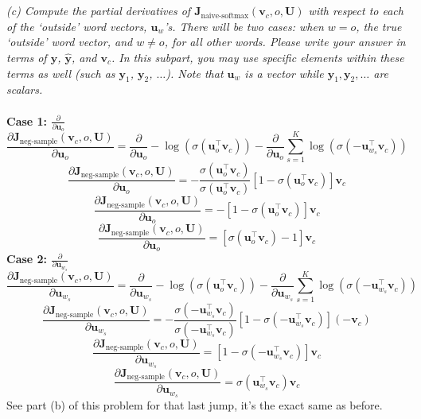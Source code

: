 \documentclass[12pt]{article}
\begin{document}
~\\
~\\
\emph{(c) Compute the partial derivatives of $\bm J_{\text{naive-softmax}}(\bm v_c, o, \bm U)$ with respect to 
each of the `outside' word vectors, $\bm u_w$'s. There will be two cases: when $w=o$, the true 
`outside' word vector, and $w \neq o$, for all other words. Please write your answer in terms of 
$\bm y$, $\hat{\bm y}$, and $\bm v_c$. In this subpart, you may use specific elements within these 
terms as well (such as $\bm y_1$, $\bm y_2$, $\dots$). Note that $\bm u_w$ is a vector while 
$\bm y_1, \bm y_2, \dots$ are scalars.}
~\\
~\\
\textbf{Case 1: $\frac{\partial}{\partial \bm u_o}$}
\begin{equation*}
    \frac{\partial \bm J_{\text{neg-sample}}(\bm v_c, o, \bm U)}{\partial \bm u_o} = 
    \frac{\partial}{\partial \bm u_o}
    -\log(\sigma(\bm u_o^\top \bm v_c)) - 
    \frac{\partial}{\partial \bm u_o}
    \sum_{s=1}^K \log(\sigma(-\bm u_{w_s}^\top \bm v_c))
\end{equation*}
\begin{equation*}
    \frac{\partial \bm J_{\text{neg-sample}}(\bm v_c, o, \bm U)}{\partial \bm u_o} = 
    - \frac{\sigma(\bm u_o^\top \bm v_c)}{\sigma(\bm u_o^\top \bm v_c)}
    [1 - \sigma(\bm u_o^\top \bm v_c)] \bm v_c
\end{equation*}
\begin{equation*}
    \frac{\partial \bm J_{\text{neg-sample}}(\bm v_c, o, \bm U)}{\partial \bm u_o} = 
    - [1 - \sigma(\bm u_o^\top \bm v_c)] \bm v_c
\end{equation*}
\begin{equation*}
    \frac{\partial \bm J_{\text{neg-sample}}(\bm v_c, o, \bm U)}{\partial \bm u_o} = 
    [\sigma(\bm u_o^\top \bm v_c) - 1] \bm v_c
\end{equation*}
\textbf{Case 2: $\frac{\partial}{\partial \bm u_{w_s}}$}
\begin{equation*}
    \frac{\partial \bm J_{\text{neg-sample}}(\bm v_c, o, \bm U)}{\partial \bm u_{w_s}} = 
    \frac{\partial}{\partial \bm u_{w_s}}
    -\log(\sigma(\bm u_o^\top \bm v_c)) - 
    \frac{\partial}{\partial \bm u_{w_s}}
    \sum_{s=1}^K \log(\sigma(-\bm u_{w_s}^\top \bm v_c))
\end{equation*}
\begin{equation*}
    \frac{\partial \bm J_{\text{neg-sample}}(\bm v_c, o, \bm U)}{\partial \bm u_{w_s}} = 
    - \frac{\sigma(-\bm u_{w_s}^\top \bm v_c)}{\sigma(-\bm u_{w_s}^\top \bm v_c)}
    [1 - \sigma(-\bm u_{w_s}^\top \bm v_c)]
    (- \bm v_c)
\end{equation*}
\begin{equation*}
    \frac{\partial \bm J_{\text{neg-sample}}(\bm v_c, o, \bm U)}{\partial \bm u_{w_s}} = 
    [1 - \sigma(-\bm u_{w_s}^\top \bm v_c)]
    \bm v_c
\end{equation*}
\begin{equation*}
    \frac{\partial \bm J_{\text{neg-sample}}(\bm v_c, o, \bm U)}{\partial \bm u_{w_s}} = 
    \sigma(\bm u_{w_s}^\top \bm v_c) \bm v_c
\end{equation*}
See part (b) of this problem for that last jump, it's the exact same as before. 
\end{document}
